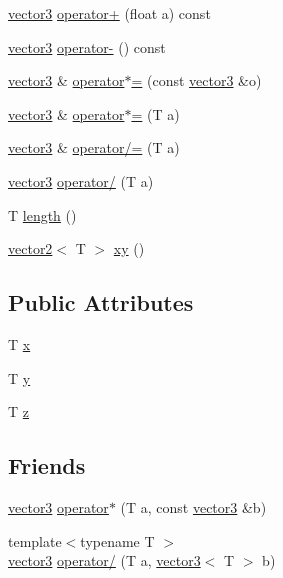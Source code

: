 \begin{DoxyCompactItemize}
\item 
\hyperlink{structvector3}{vector3} \hyperlink{structvector3_a52ca9e8004e4785b29514d1f37104af1}{operator+} (float a) const 
\item 
\hyperlink{structvector3}{vector3} \hyperlink{structvector3_a68652fed6430d08fb7cf7c69f9012217}{operator-\/} () const 
\item 
\hyperlink{structvector3}{vector3} \& \hyperlink{structvector3_a995b6f52dc3a705cef8d52ddd486ba3c}{operator$\ast$=} (const \hyperlink{structvector3}{vector3} \&o)
\item 
\hyperlink{structvector3}{vector3} \& \hyperlink{structvector3_a8ef9bc555fdedf081514841da31ba049}{operator$\ast$=} (T a)
\item 
\hyperlink{structvector3}{vector3} \& \hyperlink{structvector3_a85b98bbf3c4b2bea6c453732ee0856fc}{operator/=} (T a)
\item 
\hyperlink{structvector3}{vector3} \hyperlink{structvector3_a1839b846d469f82fc1cf8e57e37f3e41}{operator/} (T a)
\item 
T \hyperlink{structvector3_a3fc5ca7592aadf2aca643bbfe9190be6}{length} ()
\item 
\hyperlink{structvector2}{vector2}$<$ T $>$ \hyperlink{structvector3_a08becc53916249d8c8bf6eb5a83ac21e}{xy} ()
\end{DoxyCompactItemize}
\subsection*{Public Attributes}
\begin{DoxyCompactItemize}
\item 
T \hyperlink{structvector3_a5b466692e9550284d17a1bee6a6b8518}{x}
\item 
T \hyperlink{structvector3_a1faa20a703bae3d1a673856466758383}{y}
\item 
T \hyperlink{structvector3_a90c50e80a32423d5cc76f40e5f53ffbe}{z}
\end{DoxyCompactItemize}
\subsection*{Friends}
\begin{DoxyCompactItemize}
\item 
\hyperlink{structvector3}{vector3} \hyperlink{structvector3_a83c6ad5edd87abb65a597739d00e4e4a}{operator$\ast$} (T a, const \hyperlink{structvector3}{vector3} \&b)
\item 
{\footnotesize template$<$typename T $>$ }\\\hyperlink{structvector3}{vector3} \hyperlink{structvector3_a6a9df656c3922224500ee48266593abe}{operator/} (T a, \hyperlink{structvector3}{vector3}$<$ T $>$ b)
\end{DoxyCompactItemize}


